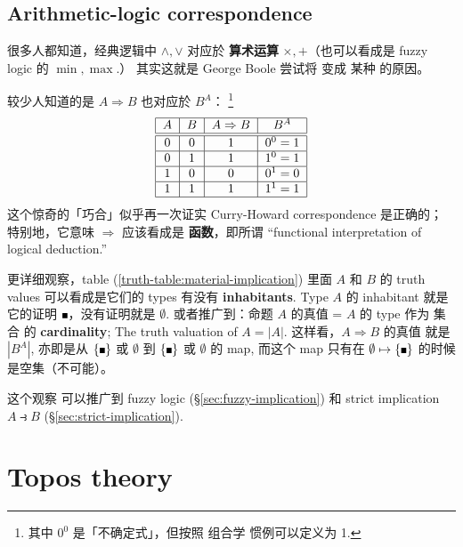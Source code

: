 \subsection{Arithmetic-logic correspondence}

很多人都知道，经典逻辑中 $\wedge, \vee$ 对应於 \textbf{算术运算} $\times, +$（也可以看成是 fuzzy logic 的 $\min, \max$.） 其实这就是 George Boole 尝试将  变成 某种 的原因。

较少人知道的是 $A \Rightarrow B$ 也对应於 $B^A$： \footnote{其中 $0^0$ 是「不确定式」，但按照 组合学 惯例可以定义为 1.}
\begin{equation}
\label{truth-table:material-implication}
\begin{tabular}{|c|c|c|c|}
	\hline 
	$A$ & $B$ & $A \Rightarrow B$ & $B^A$ \\ 
	\hline \hline 
	0 & 0 & 1 & $0^0 = 1$ \\
	\hline 
	0 & 1 & 1 & $1^0 = 1$ \\ 
	\hline 
	1 & 0 & 0 & $0^1 = 0$ \\ 
	\hline 
	1 & 1 & 1 & $1^1 = 1$ \\ 
	\hline 
\end{tabular} 
\end{equation}
这个惊奇的「巧合」似乎再一次证实 Curry-Howard correspondence 是正确的； 特别地，它意味 $\Rightarrow$ 应该看成是 \textbf{函数}，即所谓 ``functional interpretation of logical deduction.'' 

更详细观察，table (\ref{truth-table:material-implication}) 里面 $A$ 和 $B$ 的 truth values 可以看成是它们的 types 有没有 \textbf{inhabitants}. Type $A$ 的 inhabitant 就是它的证明 $\witness$，没有证明就是 $\emptyset$.  或者推广到：命题 $A$ 的真值 = $A$ 的 type 作为 集合 的 \textbf{cardinality}; The truth valuation of $A = |A|$.  这样看，$A \Rightarrow B$ 的真值 就是 $|B^A|$, 亦即是从 $\{\witness\}$ 或 $\emptyset$ 到 $\{\witness\}$ 或 $\emptyset$ 的 map, 而这个 map 只有在 $\emptyset \mapsto \{\witness\}$ 的时候是空集（不可能）。

这个观察 可以推广到 fuzzy logic (\S\ref{sec:fuzzy-implication}) 和 strict implication $A \strictif B$ (\S\ref{sec:strict-implication}).

\section{Topos theory}

